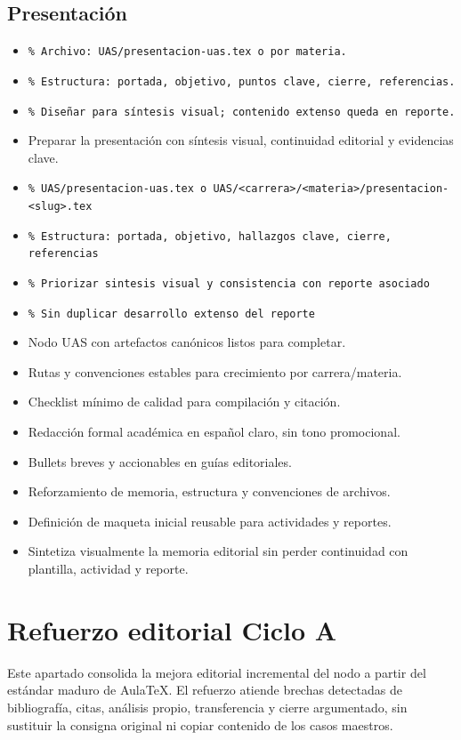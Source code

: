 \documentclass[12pt]{article}
\begin{document}
\subsection*{Presentación}
\begin{itemize}[leftmargin=*]
  \item \texttt{\% Archivo: UAS/presentacion-uas.tex o por materia.}
  \item \texttt{\% Estructura: portada, objetivo, puntos clave, cierre, referencias.}
  \item \texttt{\% Diseñar para síntesis visual; contenido extenso queda en reporte.}
  \item Preparar la presentación con síntesis visual, continuidad editorial y evidencias clave.
  \item \texttt{\% UAS/presentacion-uas.tex o UAS/<carrera>/<materia>/presentacion-<slug>.tex}
  \item \texttt{\% Estructura: portada, objetivo, hallazgos clave, cierre, referencias}
  \item \texttt{\% Priorizar sintesis visual y consistencia con reporte asociado}
  \item \texttt{\% Sin duplicar desarrollo extenso del reporte}
  \item Nodo UAS con artefactos canónicos listos para completar.
  \item Rutas y convenciones estables para crecimiento por carrera/materia.
  \item Checklist mínimo de calidad para compilación y citación.
  \item Redacción formal académica en español claro, sin tono promocional.
  \item Bullets breves y accionables en guías editoriales.
  \item Reforzamiento de memoria, estructura y convenciones de archivos.
  \item Definición de maqueta inicial reusable para actividades y reportes.
  \item Sintetiza visualmente la memoria editorial sin perder continuidad con plantilla, actividad y reporte.
\end{itemize}

\section*{Refuerzo editorial Ciclo A}
Este apartado consolida la mejora editorial incremental del nodo a partir del estándar maduro de AulaTeX. El refuerzo atiende brechas detectadas de bibliografía, citas, análisis propio, transferencia y cierre argumentado, sin sustituir la consigna original ni copiar contenido de los casos maestros.
\end{document}
